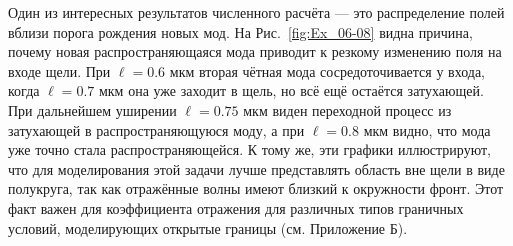 Один из интересных результатов численного расчёта --- это распределение полей вблизи порога рождения новых мод. На Рис.~\ref{fig:Ex_06-08} видна причина, почему новая распространяющаяся мода приводит к резкому изменению поля на входе щели. При $\ell = 0.6$ мкм вторая чётная мода сосредоточивается у входа, когда $\ell = 0.7$ мкм она уже заходит в щель, но всё ещё остаётся затухающей. При дальнейшем уширении $\ell=0.75$ мкм виден переходной процесс из затухающей в распространяющуюся моду, а при $\ell = 0.8$ мкм видно, что мода уже точно стала распространяющейся. К тому же, эти графики иллюстрируют, что для моделирования этой задачи лучше представлять область вне щели в виде полукруга, так как отражённые волны имеют близкий к окружности фронт. Этот факт важен для коэффициента отражения для различных типов граничных условий, моделирующих открытые границы (см. Приложение Б).  
